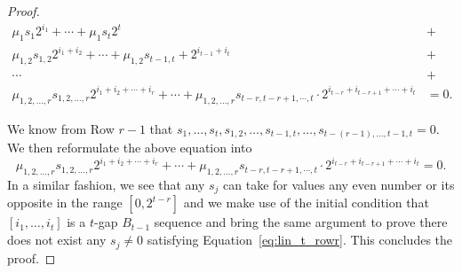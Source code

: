 \begin{proof}
\begin{equation*}
    \begin{split}
        \mu_1 s_1 2^{i_1} + \cdots + \mu_1 s_t 2^t &+\\
        \mu_{1,2} s_{1,2} 2^{i_1 + i_2} + \cdots + \mu_{1,2} s_{t-1,t}+ 2^{i_{t-1} + i_{t}} &+\\
        \cdots &+\\
        \mu_{1,2,\ldots, r} s_{1,2,\ldots, r} 2^{i_1 + i_2 + \cdots + i_r} + \cdots + \mu_{1,2,\ldots, r} s_{t-r,t-r+1,\cdots,t} \cdot 2^{i_{t-r} + i_{t-r+1} + \cdots + i_{t}} &= 0.
    \end{split}
\end{equation*}

We know from Row $r-1$ that $s_1, \ldots, s_t, s_{1,2}, \ldots, s_{t-1,t}, \ldots, s_{t-(r-1),\ldots,t-1,t} = 0$.
We then reformulate the above equation into
\begin{equation}\label{eq:lin_t_rowr}
    \mu_{1,2,\ldots, r} s_{1,2,\ldots, r} 2^{i_1 + i_2 + \cdots + i_r} + \cdots + \mu_{1,2,\ldots, r} s_{t-r,t-r+1,\cdots,t} \cdot 2^{i_{t-r} + i_{t-r+1} + \cdots + i_{t}} = 0.
\end{equation}
In a similar fashion, we see that any $s_j$ can take for values any even number
or its opposite in the range $[0, 2^{t-r}]$ and we make use of the initial
condition that $[i_1, \ldots, i_t]$ is a $t$-gap $B_{t-1}$ sequence and bring
the same argument to prove there does not exist any $s_j \neq 0$ satisfying
Equation~\ref{eq:lin_t_rowr}. This concludes the proof.
\end{proof}
